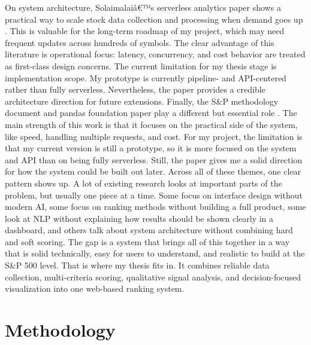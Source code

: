 \documentclass[12pt]{article}
\begin{document}
On system architecture, Solaimalaiâ€™s serverless analytics paper shows a practical way to scale stock data collection and processing when demand goes up \cite{solaimalai2025serverless}. This is valuable for the long-term roadmap of my project, which may need frequent updates across hundreds of symbols. The clear advantage of this literature is operational focus: latency, concurrency, and cost behavior are treated as first-class design concerns. The current limitation for my thesis stage is implementation scope. My prototype is currently pipeline- and API-centered rather than fully serverless. Nevertheless, the paper provides a credible architecture direction for future extensions.
Finally, the S\&P methodology document and pandas foundation paper play a different but essential role \cite{SPGlobal2016Methodology, McKinney2010Pandas}. The main strength of this work is that it focuses on the practical side of the system, like speed, handling multiple requests, and cost. For my project, the limitation is that my current version is still a prototype, so it is more focused on the system and API than on being fully serverless. Still, the paper gives me a solid direction for how the system could be built out later. 
Across all of these themes, one clear pattern shows up. A lot of existing research looks at important parts of the problem, but usually one piece at a time. Some focus on interface design without modern AI, some focus on ranking methods without building a full product, some look at NLP without explaining how results should be shown clearly in a dashboard, and others talk about system architecture without combining hard and soft scoring. The gap is a system that brings all of this together in a way that is solid technically, easy for users to understand, and realistic to build at the S\&P 500 level. That is where my thesis fits in. It combines reliable data collection, multi-criteria scoring, qualitative signal analysis, and decision-focused visualization into one web-based ranking system.

\section{Methodology}
\end{document}
